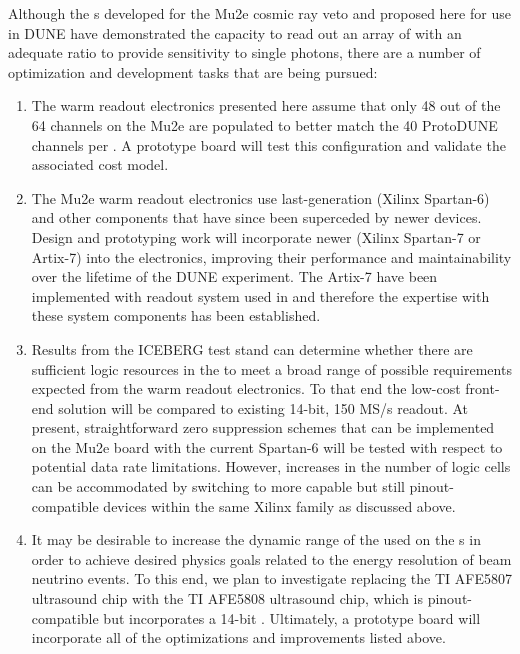 
Although the s developed for the Mu2e cosmic ray veto and proposed here for use in DUNE have %
demonstrated the capacity to read out an array of  with an adequate  ratio to provide sensitivity to single photons, there are a number of optimization and development tasks that are being pursued:  
\begin{enumerate}
\item The warm readout electronics presented here assume that only 48 out of the 64 channels on the Mu2e  are populated to better match the 40 ProtoDUNE channels per .  A prototype board will %
test this configuration and validate the associated cost model.  
\item The Mu2e warm readout electronics use last-generation (Xilinx\texttrademark{} Spartan-6)  and other components that have since been superceded by newer devices.  Design and prototyping work will %
incorporate newer  (Xilinx Spartan-7 or Artix-7) into the electronics, %
improving their performance and maintainability over the lifetime of the DUNE experiment. The Artix-7  have been implemented with  readout system used in  and therefore the expertise with these system components has been established. 
\item Results from the ICEBERG test stand can determine whether there are sufficient logic resources in the  to meet a broad range of possible  requirements expected from the warm readout electronics. To that end the low-cost front-end solution will be compared to existing 14-bit, 150 MS/s  readout. At present, straightforward zero suppression schemes that can be implemented on the Mu2e board with the current Spartan-6  will be tested with respect to potential  data rate limitations.  However, increases in the number of logic cells can be accommodated by switching to more capable but still pinout-compatible devices within the same Xilinx  family as discussed above.  
\item It may be desirable to increase the dynamic range of the  used on the s in order to achieve desired physics goals related to the energy resolution of beam neutrino events.  To this end, %
we plan to investigate replacing the TI AFE5807 ultrasound chip with the TI AFE5808 ultrasound chip, which is pinout-compatible but incorporates a 14-bit .  Ultimately, a prototype board will %
incorporate all of the optimizations and improvements listed above.
\end{enumerate}
